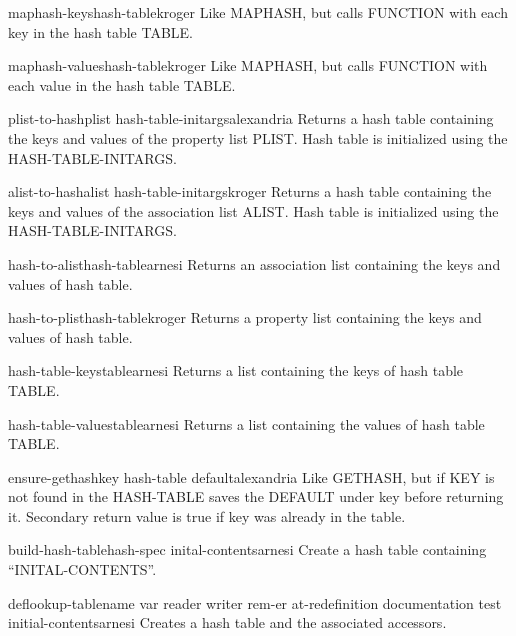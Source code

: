 \begin{function}{maphash-keys}{hash-table}{kroger}{}
  Like MAPHASH, but calls FUNCTION with each key in the hash table TABLE.
\end{function}

\begin{function}{maphash-values}{hash-table}{kroger}{}
  Like MAPHASH, but calls FUNCTION with each value in the hash table TABLE.
\end{function}

\begin{function}{plist-to-hash}{plist \rest hash-table-initargs}{alexandria}{}
  Returns a hash table containing the keys and values of the property list
PLIST. Hash table is initialized using the HASH-TABLE-INITARGS.
\end{function}

\begin{function}{alist-to-hash}{alist \rest hash-table-initargs}{kroger}{}
  Returns a hash table containing the keys and values of the association list
ALIST. Hash table is initialized using the HASH-TABLE-INITARGS.
\end{function}

\begin{function}{hash-to-alist}{hash-table}{arnesi}{}
  Returns an association list containing the keys and values of hash
  table.
\end{function}

\begin{function}{hash-to-plist}{hash-table}{kroger}{}
  Returns a property list containing the keys and values of hash
  table.
\end{function}

\begin{function}{hash-table-keys}{table}{arnesi}{}
  Returns a list containing the keys of hash table TABLE.
\end{function}

\begin{function}{hash-table-values}{table}{arnesi}{}
  Returns a list containing the values of hash table TABLE.
\end{function}

\begin{function}{ensure-gethash}{key hash-table \op default}{alexandria}{}
  Like GETHASH, but if KEY is not found in the HASH-TABLE saves the DEFAULT
under key before returning it. Secondary return value is true if key was
already in the table.
\end{function}

\begin{function}{build-hash-table}{hash-spec inital-contents}{arnesi}{}
  Create a hash table containing ``INITAL-CONTENTS''.
\end{function}

\begin{macro}{deflookup-table}{name \key var reader writer rem-er at-redefinition documentation test initial-contents}{arnesi}{}
  Creates a hash table and the associated accessors.
\end{macro}
